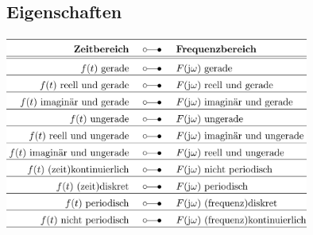 				
		\subsection{Eigenschaften}
					\includegraphics[width=10cm]{./bilder/EigenschaftenFT.jpg}\\
					
